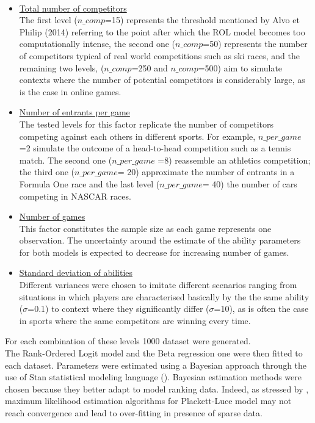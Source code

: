 \\
\begin{itemize}
  \item \underline{Total number of competitors} \\ The first  level  ($n\_comp$=15) represents the threshold mentioned by  Alvo et Philip (2014) referring to the point after which the ROL model becomes too computationally intense, the second one ($n\_comp$=50) represents the number of competitors typical of real world competitions such as ski races, and the remaining  two levels, ($n\_comp$=250 and $n\_comp$=500) aim to simulate contexts where the number of potential competitors is considerably large, as is the case in online games. 
 \item \underline{Number of entrants per game}\\ The tested levels for this factor replicate the number of competitors competing against each others in different sports. For example, $n\_per\_game$ =2 simulate the outcome of a head-to-head competition such as a tennis match. The second one ($n\_per\_game$ =8)  reassemble an athletics competition; the third one ($n\_per\_game$= 20) approximate the number of entrants in a Formula One race and the last level ($n\_per\_game$= 40) the number of cars competing in NASCAR races. 
  \item \underline{Number of games}\\ 
  This factor constitutes the sample size as each game represents one observation. The uncertainty around the estimate of the ability parameters for both models is expected to decrease for increasing number of games.
  \item \underline{Standard deviation of abilities}\\
 Different variances were chosen to imitate different  scenarios ranging from situations in which players are characterised basically by the the same ability ($\sigma$=0.1) to context where they significantly differ ($\sigma$=10), as is often the case in sports where the same competitors are winning every time. 
\end{itemize}
For each combination of these levels 1000 dataset were generated.\\
The Rank-Ordered Logit model and the Beta regression one were then fitted to each dataset. Parameters were estimated using a Bayesian approach through the use of Stan statistical modeling language (\cite{stan2018stan}). Bayesian estimation methods were chosen because they better adapt to model ranking data. Indeed, as stressed by \cite{guiver2009bayesian}, maximum likelihood estimation algorithms for Plackett-Luce model may not reach convergence and lead to over-fitting in presence of sparse data.\\
